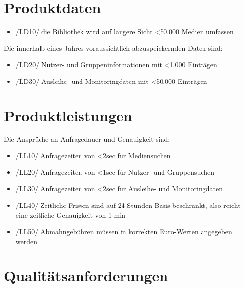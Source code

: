 \documentclass[12pt, a4paper]{article}
\begin{document}
\section{Produktdaten}
\begin{itemize}
	\item /LD10/ die Bibliothek wird auf längere Sicht <50.000 Medien umfassen
\end{itemize}

Die innerhalb eines Jahres voraussichtlich abzuspeichernden Daten sind:
\begin{itemize}
	\item /LD20/ Nutzer- und Gruppeninformationen mit <1.000 Einträgen
	\item /LD30/ Ausleihe- und Monitoringdaten mit <50.000 Einträgen
\end{itemize}

\section{Produktleistungen}
Die Ansprüche an Anfragedauer und Genauigkeit sind:
\begin{itemize}
	\item /LL10/ Anfragezeiten von <2sec für Mediensuchen
	\item /LL20/ Anfragezeiten von <1sec für Nutzer- und Gruppensuchen
	\item /LL30/ Anfragezeiten von <2sec für Ausleihe- und Monitoringdaten
	\item /LL40/ Zeitliche Fristen sind auf 24-Stunden-Basis beschränkt, also reicht eine zeitliche Genauigkeit von 1 min
	\item /LL50/ Abmahngebühren müssen in korrekten Euro-Werten angegeben werden
\end{itemize}

\section{Qualitätsanforderungen}
\end{document}
